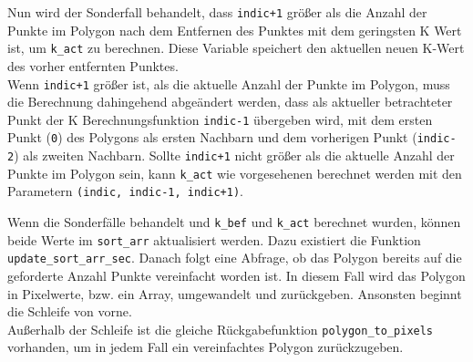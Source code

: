 {	Nun wird der Sonderfall behandelt, dass \lstinline|indic+1| größer als die Anzahl der Punkte im Polygon nach dem Entfernen des Punktes mit dem geringsten K Wert ist, um \lstinline|k_act| zu berechnen. Diese Variable speichert den aktuellen neuen K-Wert des vorher entfernten Punktes. \\
	Wenn \lstinline|indic+1| größer ist, als die aktuelle Anzahl der Punkte im Polygon, muss die Berechnung dahingehend abgeändert werden, dass als aktueller betrachteter Punkt der K Berechnungsfunktion \lstinline|indic-1| übergeben wird, mit dem ersten Punkt (\lstinline|0|) des Polygons als ersten Nachbarn und dem vorherigen Punkt (\lstinline|indic-2|) als zweiten Nachbarn. Sollte \lstinline|indic+1| nicht größer als die aktuelle Anzahl der Punkte im Polygon sein, kann \lstinline|k_act| wie vorgesehenen berechnet werden mit den Parametern \lstinline|(indic, indic-1, indic+1)|.

	

	Wenn die Sonderfälle behandelt und \lstinline|k_bef| und \lstinline|k_act| berechnet wurden, können beide Werte im \lstinline|sort_arr| aktualisiert werden. Dazu existiert die Funktion \lstinline|update_sort_arr_sec|. Danach folgt eine Abfrage, ob das Polygon bereits auf die geforderte Anzahl Punkte vereinfacht worden ist. In diesem Fall wird das Polygon in Pixelwerte, bzw. ein Array, umgewandelt und zurückgeben. Ansonsten beginnt die Schleife von vorne. \\
	Außerhalb der Schleife ist die gleiche Rückgabefunktion \lstinline|polygon_to_pixels| vorhanden, um in jedem Fall ein vereinfachtes Polygon zurückzugeben.


	

}
